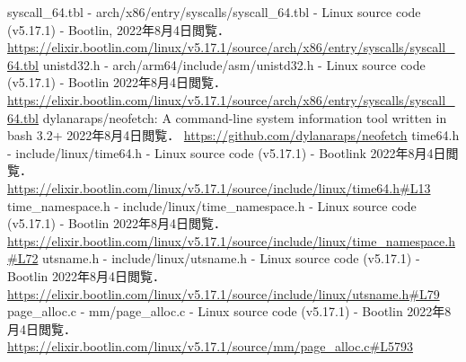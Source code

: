 \documentclass[12pt,a4paper,dvipdfmx]{jsreport}
\begin{document}








\begin{thebibliography}{9}
     syscall\_64.tbl - arch/x86/entry/syscalls/syscall\_64.tbl - Linux source code (v5.17.1) - Bootlin,
        2022年8月4日閲覧．
        \url{https://elixir.bootlin.com/linux/v5.17.1/source/arch/x86/entry/syscalls/syscall\_64.tbl}
     unistd32.h - arch/arm64/include/asm/unistd32.h - Linux source code (v5.17.1) - Bootlin
        2022年8月4日閲覧．
        \url{https://elixir.bootlin.com/linux/v5.17.1/source/arch/x86/entry/syscalls/syscall\_64.tbl}
     dylanaraps/neofetch: A command-line system information tool written in bash 3.2+
        2022年8月4日閲覧．
        \url{https://github.com/dylanaraps/neofetch}
     time64.h - include/linux/time64.h - Linux source code (v5.17.1) - Bootlink
        2022年8月4日閲覧．
        \url{https://elixir.bootlin.com/linux/v5.17.1/source/include/linux/time64.h#L13}
     time\_namespace.h - include/linux/time\_namespace.h - Linux source code (v5.17.1) - Bootlin
        2022年8月4日閲覧．
        \url{https://elixir.bootlin.com/linux/v5.17.1/source/include/linux/time\_namespace.h#L72}
     utsname.h - include/linux/utsname.h - Linux source code (v5.17.1) - Bootlin
        2022年8月4日閲覧．
        \url{https://elixir.bootlin.com/linux/v5.17.1/source/include/linux/utsname.h#L79}
     page\_alloc.c - mm/page\_alloc.c - Linux source code (v5.17.1) - Bootlin
        2022年8月4日閲覧．
        \url{https://elixir.bootlin.com/linux/v5.17.1/source/mm/page\_alloc.c#L5793}
\end{thebibliography}
\end{document}
